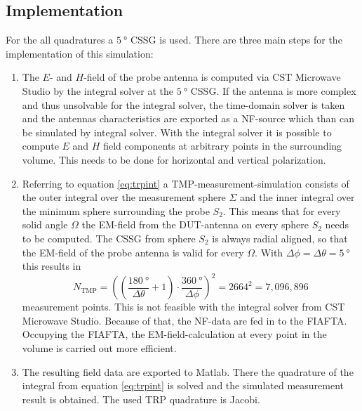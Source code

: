 \subsection{Implementation}

For the all quadratures a $\SI{5}{\degree}$ \ac{CSSG} is used. There are three main steps for the implementation of this simulation:

\begin{enumerate}
\item The $E$- and $H$-field of the probe antenna is computed via CST Microwave Studio\texttrademark{} by the integral solver at the $\SI{5}{\degree}$ \ac{CSSG}. If the antenna is more complex and thus unsolvable for the integral solver, the time-domain solver is taken and the antennas characteristics are exported as a \ac{NF}-source which than can be simulated by integral solver. With the integral solver it is possible to compute $E$ and $H$ field components at arbitrary points in the surrounding volume. This needs to be done for horizontal and vertical polarization.
\item Referring to equation \ref{eq:trpint} a \ac{TMP}-measurement-simulation consists of the outer integral over the measurement sphere $\Sigma$ and the inner integral over the minimum sphere surrounding the probe $S_2$. This means that for every solid angle $\Omega$ the \ac{EM}-field from the \ac{DUT}-antenna on every sphere $S_2$ needs to be computed. The \ac{CSSG} from sphere $S_2$ is always radial aligned, so that the \ac{EM}-field of the probe antenna is valid for every $\Omega$. With $\Delta\phi=\Delta\theta=\SI{5}{\degree}$ this results in
\begin{equation}
N_\text{TMP}=\left(\left(\frac{\SI{180}{\degree}}{\Delta\theta}+1\right)\cdot\frac{\SI{360}{\degree}}{\Delta\phi}\right)^2=2664^2=7,096,896
\end{equation}
measurement points. This is not feasible with the integral solver from CST Microwave Studio\texttrademark{}. Because of that, the \ac{NF}-data are fed in to the \ac{FIAFTA}. Occupying the \ac{FIAFTA}, the \ac{EM}-field-calculation at every point in the volume is carried out more efficient.\cite{mypaper} \cite{fiafta}
\item The resulting field data are exported to Matlab\texttrademark{}. There the quadrature of the integral from equation \ref{eq:trpint} is solved and the simulated measurement result is obtained. The used \ac{TRP} quadrature is Jacobi.
\end{enumerate} 


